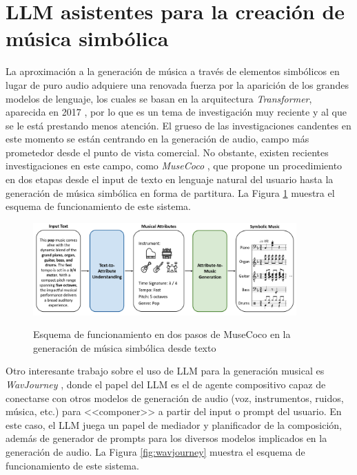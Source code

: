 \section{LLM asistentes para la creación de música simbólica}
\label{sec:llm_asistentes_creacion_codigo_programacion}

La aproximación a la generación de música a través de elementos simbólicos en lugar de puro audio adquiere una renovada fuerza por la aparición de los grandes modelos de lenguaje, los cuales se basan en la arquitectura \textit{Transformer}, aparecida en 2017 \citep{vaswaniAttentionAllYou2017}, por lo que es un tema de investigación muy reciente y al que se le está prestando menos atención. El grueso de las investigaciones candentes en este momento se están centrando en la generación de audio, campo más prometedor desde el punto de vista comercial. No obstante, existen recientes investigaciones en este campo, como \textit{MuseCoco} \citep{luMuseCocoGeneratingSymbolic2023}, que propone un procedimiento en dos etapas desde el input de texto en lenguaje natural del usuario hasta la generación de música simbólica en forma de partitura. La Figura \ref{fig:musecoco} muestra el esquema de funcionamiento de este sistema. 

\begin{figure}[H]
    \caption[Esquema de funcionamiento en dos pasos de MuseCoco texto--música]{Esquema de funcionamiento en dos pasos de MuseCoco en la generación de música simbólica desde texto}
    \centering
    \includegraphics[width=0.9\textwidth]{./figuras/musecoco_two_steps.png}
    \label{fig:musecoco}
\end{figure}

Otro interesante trabajo sobre el uso de LLM para la generación musical es \textit{WavJourney} \citep{liuWavJourneyCompositionalAudio2023}, donde el papel del LLM es el de agente compositivo capaz de conectarse con otros modelos de generación de audio (voz, instrumentos, ruidos, música, etc.) para <<componer>> a partir del input o prompt del usuario. En este caso, el LLM juega un papel de mediador y planificador de la composición, además de generador de prompts para los diversos modelos implicados en la generación de audio. La Figura \ref{fig:wavjourney} muestra el esquema de funcionamiento de este sistema.

